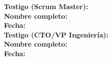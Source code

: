 \noindent
\textbf{Testigo (Scrum Master):} \underline{\hspace{6cm}} \\[0.5cm]

\textbf{Nombre completo:} \underline{\hspace{6cm}} \\[0.5cm]

\textbf{Fecha:} \underline{\hspace{4cm}} \\[1cm]


\noindent
\textbf{Testigo (CTO/VP Ingeniería):} \underline{\hspace{6cm}} \\[0.5cm]

\textbf{Nombre completo:} \underline{\hspace{6cm}} \\[0.5cm]

\textbf{Fecha:} \underline{\hspace{4cm}} \\